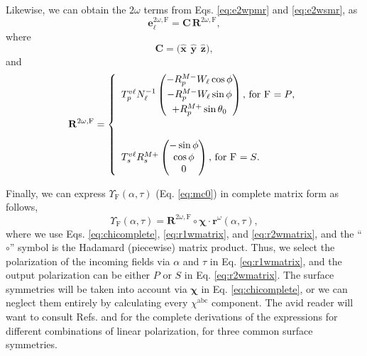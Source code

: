 \documentclass[aps,pra,10pt,amsmath,twocolumn,letterpaper]{revtex4-1}
\begin{document}
Likewise, we can obtain the $2\omega$ terms from Eqs. \eqref{eq:e2wpmr} and
\eqref{eq:e2wsmr}, as
\begin{equation*}\label{eq:e2wvector}
\mathbf{e}^{2\omega,\mathrm{F}}_{\ell} =
\mathbf{C}\,\mathbf{R}^{2\omega,\mathrm{F}},
\end{equation*}
where
\begin{equation*}
\mathbf{C} = 
\big(
\hat{\mathbf{x}}\hspace{5pt}
\hat{\mathbf{y}}\hspace{5pt}
\hat{\mathbf{z}}
\big),
\end{equation*}
and
\begin{equation}\label{eq:r2wmatrix}
\mathbf{R}^{2\omega,\mathrm{F}} =
\left\{
\begin{array}{ l }
T^{v\ell}_{p}N_{\ell}^{-1}
\begin{pmatrix}
-R^{M-}_{p}W_{\ell}\cos\phi \\[3pt]
-R^{M-}_{p}W_{\ell}\sin\phi \\[3pt]
+R^{M+}_{p}\sin\theta_{0}
\end{pmatrix},\,\text{for F $ = P$},\\\\\\
T_{s}^{v\ell}R^{M+}_{s}
\begin{pmatrix}
-\sin\phi\\
\cos\phi\\
0
\end{pmatrix},\,\text{for F $ = S$}.
\end{array}
\right.
\end{equation}

Finally, we can express $\Upsilon_{\mathrm{F}}(\alpha,\tau)$ (Eq.
\eqref{eq:mc0}) in complete matrix form as follows,
\begin{equation*}\label{eq:bigassmofo}
\Upsilon_{\mathrm{F}}(\alpha,\tau) =
\mathbf{R}^{2\omega,\mathrm{F}}
\circ\boldsymbol{\chi}\cdot
\mathbf{r}^{\omega}(\alpha,\tau),
\end{equation*}
where we use Eqs. \eqref{eq:chicomplete}, \eqref{eq:r1wmatrix}, and
\eqref{eq:r2wmatrix}, and the ``$\circ$'' symbol is the Hadamard (piecewise)
matrix product. Thus, we select the polarization of the incoming fields via
$\alpha$ and $\tau$ in Eq. \eqref{eq:r1wmatrix}, and the output polarization can
be either $P$ or $S$ in Eq. \eqref{eq:r2wmatrix}. The surface symmetries will be
taken into account via $\boldsymbol{\chi}$ in Eq. \eqref{eq:chicomplete}, or we
can neglect them entirely by calculating every $\chi^{\mathrm{abc}}$ component.
The avid reader will want to consult Refs. \cite{andersonPRB16b} and
\cite{andersonthesis} for the complete derivations of the expressions for
different combinations of linear polarization, for three common surface
symmetries.
\end{document}
